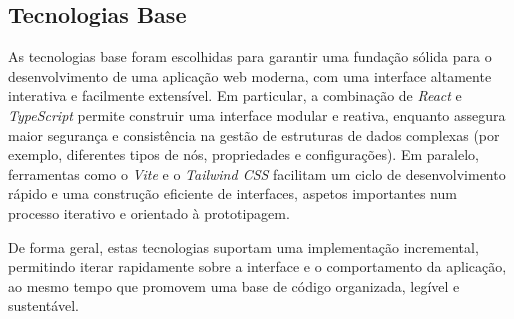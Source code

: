 \subsection{Tecnologias Base}
\label{subsec:cap3_tecnologias_base}

As tecnologias base foram escolhidas para garantir uma fundação sólida para o desenvolvimento de uma aplicação web moderna, com uma interface altamente interativa e facilmente extensível. Em particular, a combinação de \textit{React} e \textit{TypeScript} permite construir uma interface modular e reativa, enquanto assegura maior segurança e consistência na gestão de estruturas de dados complexas (por exemplo, diferentes tipos de nós, propriedades e configurações). Em paralelo, ferramentas como o \textit{Vite} e o \textit{Tailwind CSS} facilitam um ciclo de desenvolvimento rápido e uma construção eficiente de interfaces, aspetos importantes num processo iterativo e orientado à prototipagem.

De forma geral, estas tecnologias suportam uma implementação incremental, permitindo iterar rapidamente sobre a interface e o comportamento da aplicação, ao mesmo tempo que promovem uma base de código organizada, legível e sustentável.

